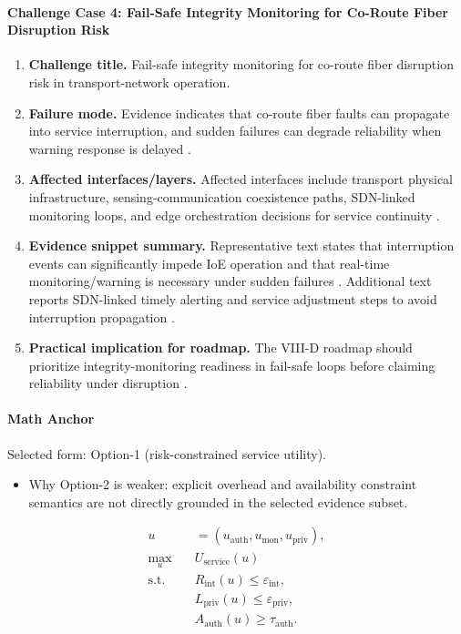 \documentclass[lettersize,journal]{IEEEtran}
\begin{document}
\paragraph{Challenge Case 4: Fail-Safe Integrity Monitoring for Co-Route Fiber Disruption Risk}
\begin{enumerate}
    \item \textbf{Challenge title.} Fail-safe integrity monitoring for co-route fiber disruption risk in transport-network operation.
    \item \textbf{Failure mode.} Evidence indicates that co-route fiber faults can propagate into service interruption, and sudden failures can degrade reliability when warning response is delayed \cite{O_ISAC_041}.
    \item \textbf{Affected interfaces/layers.} Affected interfaces include transport physical infrastructure, sensing-communication coexistence paths, SDN-linked monitoring loops, and edge orchestration decisions for service continuity \cite{O_ISAC_041}.
    \item \textbf{Evidence snippet summary.} Representative text states that interruption events can significantly impede IoE operation and that real-time monitoring/warning is necessary under sudden failures \cite{O_ISAC_041}. Additional text reports SDN-linked timely alerting and service adjustment steps to avoid interruption propagation \cite{O_ISAC_041}.
    \item \textbf{Practical implication for roadmap.} The VIII-D roadmap should prioritize integrity-monitoring readiness in fail-safe loops before claiming reliability under disruption \cite{O_ISAC_041}.
\end{enumerate}

\paragraph{Math Anchor}
Selected form: Option-1 (risk-constrained service utility).
\begin{itemize}
    \item Why Option-2 is weaker: explicit overhead and availability constraint semantics are not directly grounded in the selected evidence subset.
\end{itemize}

\begin{equation}
\begin{aligned}
u &= (u_{\mathrm{auth}},u_{\mathrm{mon}},u_{\mathrm{priv}}),\\
\max_{u} \quad & U_{\mathrm{service}}(u) \\
\text{s.t.} \quad & R_{\mathrm{int}}(u) \le \varepsilon_{\mathrm{int}}, \\
& L_{\mathrm{priv}}(u) \le \varepsilon_{\mathrm{priv}}, \\
& A_{\mathrm{auth}}(u) \ge \tau_{\mathrm{auth}}.
\end{aligned}
\end{equation}
\end{document}
